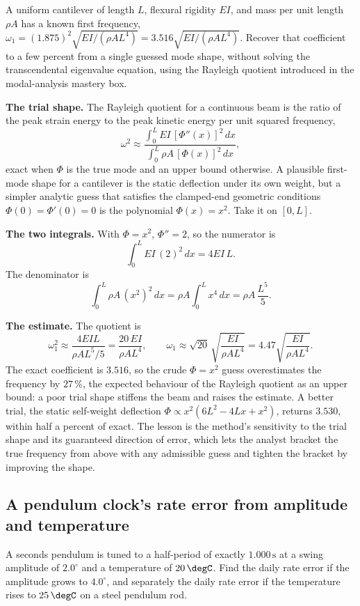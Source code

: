 A uniform cantilever of length $L$, flexural rigidity $EI$, and mass per
unit length $\rho A$ has a known first frequency, $\omega_1 =
(1.875)^2\sqrt{EI/(\rho A L^4)} = 3.516\sqrt{EI/(\rho A L^4)}$. Recover
that coefficient to a few percent from a single guessed mode shape,
without solving the transcendental eigenvalue equation, using the
Rayleigh quotient introduced in the modal-analysis mastery box.

\textbf{The trial shape.} The Rayleigh quotient for a continuous beam is
the ratio of the peak strain energy to the peak kinetic energy per unit
squared frequency,
\[
\omega^2 \approx \frac{\int_0^L EI\,[\Phi''(x)]^2\,dx}{\int_0^L \rho A\,
[\Phi(x)]^2\,dx},
\]
exact when $\Phi$ is the true mode and an upper bound otherwise. A
plausible first-mode shape for a cantilever is the static deflection
under its own weight, but a simpler analytic guess that satisfies the
clamped-end geometric conditions $\Phi(0) = \Phi'(0) = 0$ is the
polynomial $\Phi(x) = x^2$. Take it on $[0, L]$.

\textbf{The two integrals.} With $\Phi = x^2$, $\Phi'' = 2$, so the
numerator is
\[
\int_0^L EI\,(2)^2\,dx = 4 EI\,L.
\]
The denominator is
\[
\int_0^L \rho A\,(x^2)^2\,dx = \rho A\int_0^L x^4\,dx = \rho A\,
\frac{L^5}{5}.
\]

\textbf{The estimate.} The quotient is
\[
\omega_1^2 \approx \frac{4 EI L}{\rho A L^5/5} = \frac{20\,EI}{\rho A
L^4}, \qquad \omega_1 \approx \sqrt{20}\,\sqrt{\frac{EI}{\rho A L^4}} =
4.47\sqrt{\frac{EI}{\rho A L^4}}.
\]
The exact coefficient is $3.516$, so the crude $\Phi = x^2$ guess
overestimates the frequency by $27\,\%$, the expected behaviour of the
Rayleigh quotient as an upper bound: a poor trial shape stiffens the
beam and raises the estimate. A better trial, the static
self-weight deflection $\Phi \propto x^2(6L^2 - 4Lx + x^2)$, returns
$3.530$, within half a percent of exact. The lesson is the method's
sensitivity to the trial shape and its guaranteed direction of error,
which lets the analyst bracket the true frequency from above with any
admissible guess and tighten the bracket by improving the shape.

\subsection{A pendulum clock's rate error from amplitude and temperature}

A seconds pendulum is tuned to a half-period of exactly $1.000\,\si{
\second}$ at a swing amplitude of $2.0^\circ$ and a temperature of
$20\,\degC$. Find the daily rate error if the amplitude grows to
$4.0^\circ$, and separately the daily rate error if the temperature
rises to $25\,\degC$ on a steel pendulum rod.

